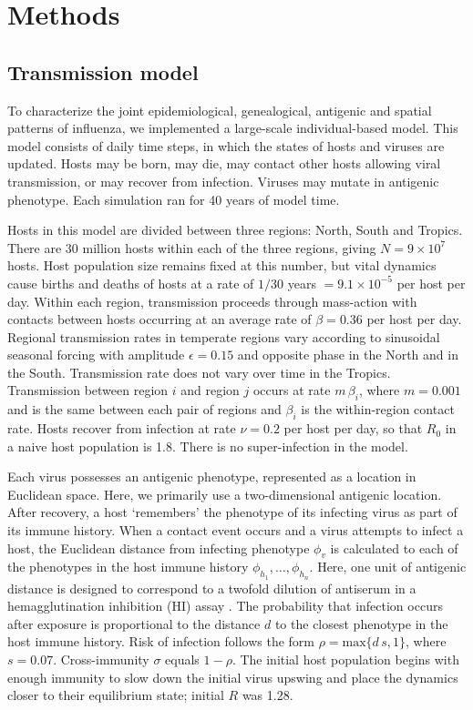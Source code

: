\section*{Methods}

\subsection*{Transmission model}

To characterize the joint epidemiological, genealogical, antigenic and spatial patterns of influenza, we implemented a large-scale individual-based model.  This model consists of daily time steps, in which the states of hosts and viruses are updated.  Hosts may be born, may die, may contact other hosts allowing viral transmission, or may recover from infection.  Viruses may mutate in antigenic phenotype.  Each simulation ran for 40 years of model time.  

Hosts in this model are divided between three regions: North, South and Tropics.  There are 30 million hosts within each of the three regions, giving $N = 9 \times 10^{7}$ hosts.  Host population size remains fixed at this number, but vital dynamics cause births and deaths of hosts at a rate of $1 / 30$ years $= 9.1 \times 10^{-5}$ per host per day.  Within each region, transmission proceeds through mass-action with contacts between hosts occurring at an average rate of $\beta = 0.36$ per host per day.  Regional transmission rates in temperate regions vary according to sinusoidal seasonal forcing with amplitude $\epsilon = 0.15$ and opposite phase in the North and in the South.  Transmission rate does not vary over time in the Tropics.  Transmission between region $i$ and region $j$ occurs at rate $m\,\beta_i$, where $m=0.001$ and is the same between each pair of regions and $\beta_i$ is the within-region contact rate.   Hosts recover from infection at rate $\nu = 0.2$ per host per day, so that $R_0$ in a naive host population is 1.8.  There is no super-infection in the model.

Each virus possesses an antigenic phenotype, represented as a location in Euclidean space.  Here, we primarily use a two-dimensional antigenic location.  After recovery, a host `remembers' the phenotype of its infecting virus as part of its immune history.  When a contact event occurs and a virus attempts to infect a host, the Euclidean distance from infecting phenotype $\phi_v$ is calculated to each of the phenotypes in the host immune history $\phi_{h_1}, \dots, \phi_{h_n}$.  Here, one unit of antigenic distance is designed to correspond to a twofold dilution of antiserum in a hemagglutination inhibition (HI) assay \cite{Smith04}. The probability that infection occurs after exposure is proportional to the distance $d$ to the closest phenotype in the host immune history.  Risk of infection follows the form $\rho = \textrm{max}\{d\,s,1\}$, where $s=0.07$.  Cross-immunity $\sigma$ equals $1-\rho$.  The initial host population begins with enough immunity to slow down the initial virus upswing and place the dynamics closer to their equilibrium state; initial $R$ was 1.28.

